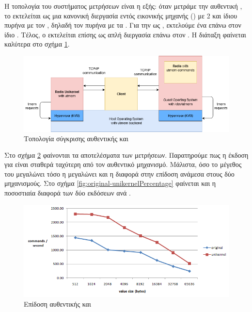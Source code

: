 Η τοπολογία του συστήματος μετρήσεων είναι η εξής:
όταν μετράμε την αυθεντική , το  εκτελείται ως μια
κανονική διεργασία εντός εικονικής μηχανής () με 2  και ίδιου
πυρήνα με τον , δηλαδή τον πυρήνα με τα . Για την 
ως , εκτελούμε ένα  επάνω στον ίδιο .
Τέλος, ο  εκτελείται επίσης ως απλή διεργασία
επάνω στον . Η διάταξη φαίνεται καλύτερα στο σχήμα \ref{fig:original-unikernelTopo}.
\newline

\begin{figure}[h]
  \includegraphics[width=\textwidth]{pictures/bench2Setup.PNG}
  \caption{Τοπολογία σύγκρισης αυθεντικής  και }
  \label{fig:original-unikernelTopo}
\end{figure}

Στο σχήμα \ref{fig:original-unikernel} φαίνονται τα αποτελέσματα των μετρήσεων. Παρατηρούμε
πως η έκδοση  για  είναι σταθερά ταχύτερη από τον αυθεντικό
μηχανισμό. Μάλιστα, όσο το
μέγεθος του  μεγαλώνει τόσο η μεγαλώνει και η διαφορά στην επίδοση
ανάμεσα στους δύο μηχανισμούς.
Στο σχήμα \ref{fig:original-unikernelPercentage}
φαίνεται και η ποσοστιαία διαφορά των δύο εκδόσεων ανά .
\newline

\begin{figure}[h]
  \includegraphics[width=\textwidth]{pictures/secondBenchmarkResults.PNG}
  \caption{Επίδοση αυθεντικής  και }
  \label{fig:original-unikernel}
\end{figure}

